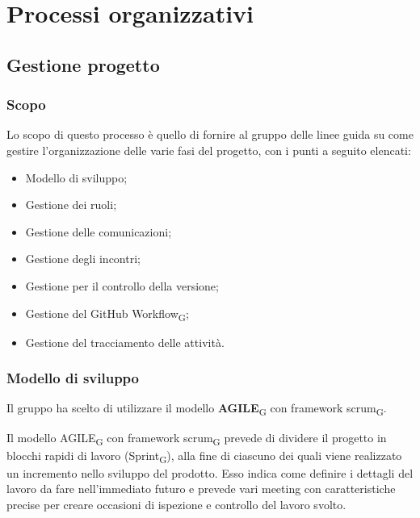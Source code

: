 \section{Processi organizzativi}
	\subsection{Gestione progetto}
	\subsubsection{Scopo}
	Lo scopo di questo processo è quello di fornire al gruppo delle linee guida su come gestire l'organizzazione delle varie fasi del progetto, con i punti a seguito elencati:
	\begin{itemize}
		\item Modello di sviluppo;
		\item Gestione dei ruoli;
		\item Gestione delle comunicazioni;
		\item Gestione degli incontri;
		\item Gestione per il controllo della versione;
		\item Gestione del GitHub Workflow\textsubscript{G};
		\item Gestione del tracciamento delle attività.
	\end{itemize}
	\subsubsection{Modello di sviluppo}
	Il gruppo ha scelto di utilizzare il modello \textbf{AGILE}\textsubscript{G} con framework scrum\textsubscript{G}.
	
	Il modello AGILE\textsubscript{G} con framework scrum\textsubscript{G} prevede di dividere il progetto in blocchi rapidi di lavoro (Sprint\textsubscript{G}),
	alla fine di ciascuno dei quali viene realizzato un incremento nello sviluppo del prodotto. 
	Esso indica come definire i dettagli del lavoro da fare nell'immediato futuro e prevede 
	vari meeting con caratteristiche precise per creare occasioni di ispezione e controllo del lavoro svolto.
	
